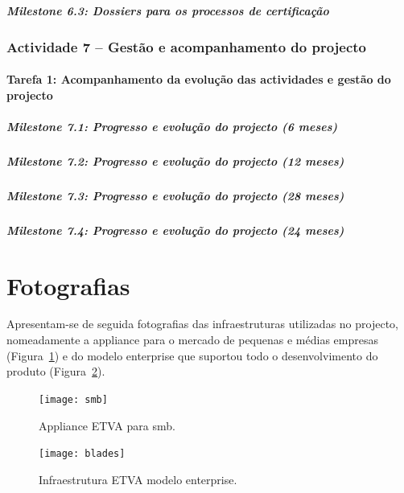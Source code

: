 \documentclass[a4paper,12pt,portugues]{article}
\begin{document}
\subparagraph{Milestone 6.3: Dossiers para os processos de certificação}


\subsubsection*{Actividade 7 – Gestão e acompanhamento do projecto}

\paragraph{Tarefa 1: Acompanhamento da evolução das actividades e gestão do projecto}

\subparagraph{Milestone 7.1: Progresso e evolução do projecto (6 meses)}

\subparagraph{Milestone 7.2: Progresso e evolução do projecto (12 meses)}

\subparagraph{Milestone 7.3: Progresso e evolução do projecto (28 meses)}

\subparagraph{Milestone 7.4: Progresso e evolução do projecto (24 meses)}









\section{Fotografias} %
\label{sec:fotografias}

Apresentam-se de seguida fotografias das infraestruturas utilizadas no projecto, nomeadamente a appliance para o mercado de pequenas e médias empresas (Figura~\ref{fig:smb}) e do modelo enterprise que suportou todo o desenvolvimento do produto (Figura~\ref{fig:blades}).

\begin{figure}[htbp]
	\centering
		\texttt{[image: smb]}
	\caption{Appliance ETVA para smb.}
	\label{fig:smb}
\end{figure}


\begin{figure}[h!]
	\centering
		\texttt{[image: blades]}
	\caption{Infraestrutura ETVA modelo enterprise.}
	\label{fig:blades}
\end{figure}


\end{document}
